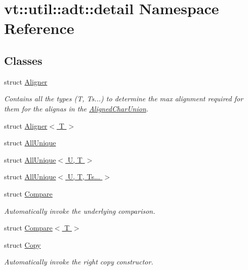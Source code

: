 \hypertarget{namespacevt_1_1util_1_1adt_1_1detail}{}\section{vt\+:\+:util\+:\+:adt\+:\+:detail Namespace Reference}
\label{namespacevt_1_1util_1_1adt_1_1detail}
\subsection*{Classes}
\begin{DoxyCompactItemize}
\item 
struct \hyperlink{structvt_1_1util_1_1adt_1_1detail_1_1_aligner}{Aligner}
\begin{DoxyCompactList}\small\item\em Contains all the types (T, Ts...) to determine the max alignment required for them for the alignas in the {\ttfamily \hyperlink{structvt_1_1util_1_1adt_1_1_aligned_char_union}{Aligned\+Char\+Union}}. \end{DoxyCompactList}\item 
struct \hyperlink{structvt_1_1util_1_1adt_1_1detail_1_1_aligner_3_01_t_01_4}{Aligner$<$ T $>$}
\item 
struct \hyperlink{structvt_1_1util_1_1adt_1_1detail_1_1_all_unique}{All\+Unique}
\item 
struct \hyperlink{structvt_1_1util_1_1adt_1_1detail_1_1_all_unique_3_01_u_00_01_t_01_4}{All\+Unique$<$ U, T $>$}
\item 
struct \hyperlink{structvt_1_1util_1_1adt_1_1detail_1_1_all_unique_3_01_u_00_01_t_00_01_ts_8_8_8_01_4}{All\+Unique$<$ U, T, Ts... $>$}
\item 
struct \hyperlink{structvt_1_1util_1_1adt_1_1detail_1_1_compare}{Compare}
\begin{DoxyCompactList}\small\item\em Automatically invoke the underlying comparison. \end{DoxyCompactList}\item 
struct \hyperlink{structvt_1_1util_1_1adt_1_1detail_1_1_compare_3_01_t_01_4}{Compare$<$ T $>$}
\item 
struct \hyperlink{structvt_1_1util_1_1adt_1_1detail_1_1_copy}{Copy}
\begin{DoxyCompactList}\small\item\em Automatically invoke the right copy constructor. \end{DoxyCompactList}\item 

\end{DoxyCompactItemize}
